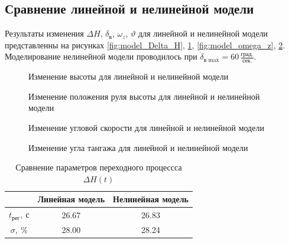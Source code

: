 \subsection{Сравнение линейной и нелинейной модели}

Результаты изменения $\Delta H$, $\delta_{в}$, $\omega_z$, $\vartheta$ для
линейной и нелинейной модели представленны на рисунках \ref{fig:model_Delta_H},
\ref{fig:delta_elevator}, \ref{fig:model_omega_z}, \ref{fig:model_theta}.
Моделирование нелинейной модели проводилось при 
$\dot{\delta}_\text{в max} = 60\, \frac{\text{град.}}{\text{сек.}}$.

\begin{figure}[H]
    \begin{minipage}{0.48\textwidth}
    \centering
    \resizebox{1.1\linewidth}{!}{}
    \caption{Изменение высоты для линейной и нелинейной модели}
    \label{fig:model_Delta_H}
    \end{minipage}
    \hfill
    \begin{minipage}{0.48\textwidth}
    \centering
    \resizebox{1.1\linewidth}{!}{}
    \caption{Изменение положения руля высоты для линейной и нелинейной модели}
    \label{fig:delta_elevator}
    \end{minipage}
\end{figure}

\begin{figure}[H]
    \begin{minipage}{0.48\textwidth}
    \centering
    \resizebox{1.1\linewidth}{!}{}
    \caption{Изменение угловой скорости для линейной и нелинейной модели}
    \label{fig:model_omega_z}
    \end{minipage}
    \hfill
    \begin{minipage}{0.48\textwidth}
    \centering
    \resizebox{1.1\linewidth}{!}{}
    \caption{Изменение угла тангажа для линейной и нелинейной модели}
    \label{fig:model_theta}
\end{minipage}
\end{figure}

\begin{table}[htpb]
    \centering
    \caption{Сравнение параметров переходного процессса $\Delta H(t)$}
    \label{tab:stat_lin_nonlin}
    \begin{tabular}{|c|c|c|}
        \hline
        {} &  Линейная модель &  Нелинейная модель \\
        \hline
        $t_{рег},\ с$ &            26.67 &              26.83 \\
        \hline
        $\sigma,\ \%$ &            28.00 &              28.24 \\
        \hline
    \end{tabular}
\end{table}

